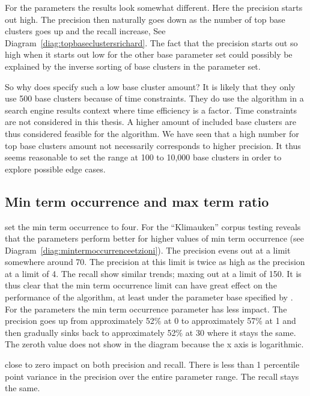For the \citeauthor{Moe2014compact} parameters the results look somewhat different. Here the precision starts out high. The precision then naturally goes down as the number of top base clusters goes up and the recall increase, See Diagram~\ref{diag:topbaseclustersrichard}. The fact that the precision starts out so high when it starts out low for the other base parameter set could possibly be explained by the inverse sorting of base clusters in the \citeauthor{Moe2014compact} parameter set.

So why does \cite{Oren1998} specify such a low base cluster amount? It is likely that they only use 500 base clusters because of time constraints. They do use the algorithm in a search engine results context where time efficiency is a factor. Time constraints are not considered in this thesis. A higher amount of included base clusters are thus considered feasible for the algorithm. We have seen that a high number for top base clusters amount not necessarily corresponds to higher precision. It thus seems reasonable to set the range at 100 to 10,000 base clusters in order to explore possible edge cases.

\subsection{Min term occurrence and max term ratio}
\citeauthor{Oren1998} set the min term occurrence to four. For the ``Klimauken'' corpus testing reveals that the \citeauthor{Oren1998} parameters perform better for higher values of min term occurrence (see Diagram~\ref{diag:mintermoccurrenceetzioni}). The precision evens out at a limit somewhere around 70. The precision at this limit is twice as high as the precision at a limit of 4. The recall show similar trends; maxing out at a limit of 150. It is thus clear that the min term occurrence limit can have great effect on the performance of the \CTC algorithm, at least under the parameter base specified by \citeauthor{Oren1998}. For the \citeauthor{Moe2014compact} parameters the min term occurrence parameter has   less impact. The precision goes up from approximately 52\% at 0 to approximately 57\% at 1 and then gradually sinks back to approximately 52\% at 30 where it stays the same. The zeroth value does not show in the diagram because the x axis is logarithmic.

close to zero impact on both precision and recall. There is less than 1 percentile point variance in the precision over the entire parameter range. The recall stays the same.

